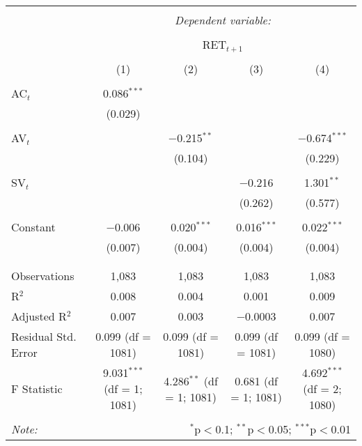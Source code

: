 
\begin{table}[!htbp] \centering 
  \caption{} 
  \label{} 
\begin{tabular}{@{\extracolsep{5pt}}lcccc} 
\\[-1.8ex]\hline 
\hline \\[-1.8ex] 
 & \multicolumn{4}{c}{\textit{Dependent variable:}} \\ 
\cline{2-5} 
\\[-1.8ex] & \multicolumn{4}{c}{RET$_{t+1}$} \\ 
\\[-1.8ex] & (1) & (2) & (3) & (4)\\ 
\hline \\[-1.8ex] 
 AC$_{t}$ & 0.086$^{***}$ &  &  &  \\ 
  & (0.029) &  &  &  \\ 
  & & & & \\ 
 AV$_{t}$ &  & $-$0.215$^{**}$ &  & $-$0.674$^{***}$ \\ 
  &  & (0.104) &  & (0.229) \\ 
  & & & & \\ 
 SV$_{t}$ &  &  & $-$0.216 & 1.301$^{**}$ \\ 
  &  &  & (0.262) & (0.577) \\ 
  & & & & \\ 
 Constant & $-$0.006 & 0.020$^{***}$ & 0.016$^{***}$ & 0.022$^{***}$ \\ 
  & (0.007) & (0.004) & (0.004) & (0.004) \\ 
  & & & & \\ 
\hline \\[-1.8ex] 
Observations & 1,083 & 1,083 & 1,083 & 1,083 \\ 
R$^{2}$ & 0.008 & 0.004 & 0.001 & 0.009 \\ 
Adjusted R$^{2}$ & 0.007 & 0.003 & $-$0.0003 & 0.007 \\ 
Residual Std. Error & 0.099 (df = 1081) & 0.099 (df = 1081) & 0.099 (df = 1081) & 0.099 (df = 1080) \\ 
F Statistic & 9.031$^{***}$ (df = 1; 1081) & 4.286$^{**}$ (df = 1; 1081) & 0.681 (df = 1; 1081) & 4.692$^{***}$ (df = 2; 1080) \\ 
\hline 
\hline \\[-1.8ex] 
\textit{Note:}  & \multicolumn{4}{r}{$^{*}$p$<$0.1; $^{**}$p$<$0.05; $^{***}$p$<$0.01} \\ 
\end{tabular} 
\end{table} 
